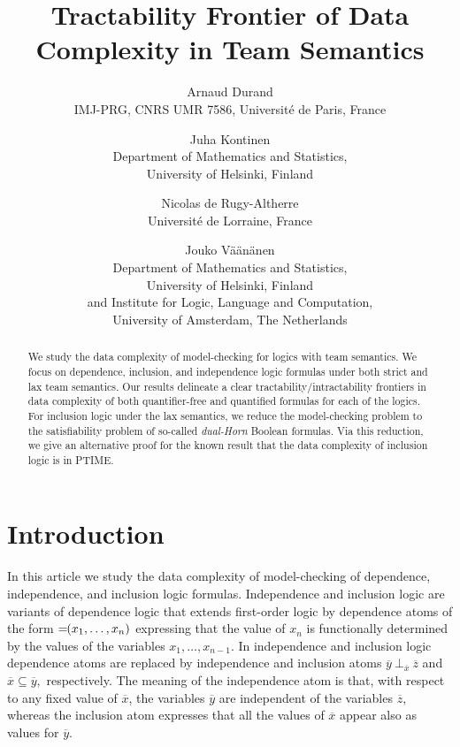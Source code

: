 \documentclass{article}
\theoremstyle{plain}
\theoremstyle{definition}
\newcommand*\dep{{=\mkern-1.2mu}}
\newcommand{\tu}[1]{\overline{#1}}
\begin{document}
\title{Tractability Frontier of Data Complexity in Team Semantics}

\author{Arnaud Durand\\
IMJ-PRG, CNRS UMR 7586, Universit\'e de Paris, France

\and

Juha Kontinen\\
Department of Mathematics and Statistics,\\
 University of Helsinki, Finland

\and Nicolas de Rugy-Altherre\\
Universit\'e de Lorraine, France

\and
Jouko V\"{a}\"{a}n\"{a}nen\\
Department of Mathematics and Statistics,\\
 University of Helsinki, Finland\\
and
Institute for Logic, Language and Computation,\\
 University of Amsterdam, The Netherlands}
\date{}



\maketitle





\begin{abstract}We study the data complexity of model-checking for logics with team semantics. We focus on dependence, inclusion, and independence logic formulas under both strict and lax team semantics. Our results delineate a clear tractability/intractability frontiers in data complexity of both quantifier-free and quantified formulas for each of the logics. 
For inclusion logic under the lax semantics, we reduce the model-checking problem to the satisfiability problem of so-called \emph{dual-Horn} Boolean formulas. Via this reduction, we give an alternative proof for the known result that the data complexity of inclusion logic is in  PTIME.
\end{abstract}

\section{Introduction}

In this article we study the data complexity of model-checking of dependence, independence, and inclusion logic formulas. Independence  and inclusion logic  \cite{gradel10,galliani12} are variants of  dependence logic \cite{vaananen07}  that  extends first-order logic by dependence atoms of the form 
$\dep(x_1,\ldots,x_n)$
expressing that the value of $x_n$ is functionally determined by the values of the variables $x_1,\ldots, x_{n-1}$. 
In independence and inclusion logic dependence atoms are replaced by independence and inclusion atoms 
$\tu{y}\ \bot_{\tu{x}} \ \tu{z}$ and  $\tu{x}\subseteq \tu{y},$
respectively. The meaning of the independence atom is that, with respect to any fixed value of  $ \tu x$, the variables $\tu y$  are independent of the variables $\tu z$, whereas the  inclusion atom expresses that all the values of $\tu{x}$ appear also as values for $\tu{y}$. 
\end{document}
